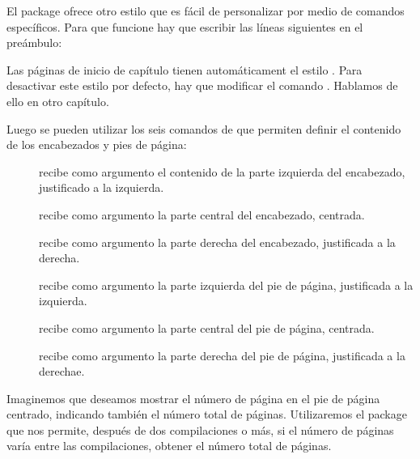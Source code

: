 El package  ofrece otro estilo que es fácil de personalizar por medio de comandos específicos. Para que funcione  hay que escribir las líneas siguientes en el preámbulo:

\begin{latexcode}
\usepackage{fancyhdr}
\pagestyle{fancy}
\end{latexcode}

\begin{plusloins}
Las páginas de inicio de capítulo tienen automáticament el estilo . Para desactivar este estilo por defecto, hay que modificar el comando . Hablamos de ello en otro capítulo. 
\end{plusloins}


Luego se pueden utilizar los seis comandos de  que permiten definir el contenido de los encabezados y pies de página:

\begin{description}
\item[] recibe como argumento el contenido de la parte izquierda del encabezado, justificado a la izquierda.
\item[] recibe como argumento la parte central del encabezado, centrada.
\item[] recibe como argumento la parte derecha del encabezado, justificada a la derecha.
\item[] recibe como argumento la parte izquierda del pie de página, justificada a la izquierda.
\item[] recibe como argumento la parte central del pie de página, centrada.
\item[] recibe como argumento la parte derecha del pie de página, justificada a la derechae.
\end{description}



Imaginemos que deseamos mostrar el número de página en el pie de página centrado, indicando también el número total de páginas. Utilizaremos el package  que nos permite, después de dos compilaciones o más, si el número de páginas varía entre las compilaciones, obtener el número total de páginas.

\begin{latexcode}
\usepackage{fancyhdr}
\pagestyle{fancy}
\usepackage{totpages}
\cfoot{{\thepage} / \ref{TotPages}}
\end{latexcode}



